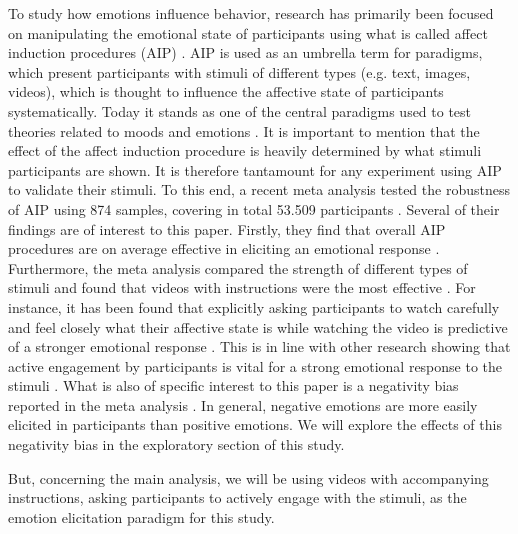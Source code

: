\documentclass{article}
\begin{document}
    To study how emotions influence behavior, research has primarily been focused on manipulating the emotional state of participants using what is called affect induction procedures (AIP) \cite{joseph2020pbb}. AIP is used as an umbrella term for paradigms, which present participants with stimuli of different types (e.g. text, images, videos), which is thought to influence the affective state of participants systematically. Today it stands as one of the central paradigms used to test theories related to moods and emotions \cite{joseph2020pbb}. It is important to mention that the effect of the affect induction procedure is heavily determined by what stimuli participants are shown. It is therefore tantamount for any experiment using AIP to validate their stimuli. To this end, a recent meta analysis tested the robustness of AIP using 874 samples, covering in total 53.509 participants \cite{joseph2020pbb}. Several of their findings are of interest to this paper. Firstly, they find that overall AIP procedures are on average effective in eliciting an emotional response \cite{joseph2020pbb}. Furthermore, the meta analysis compared the strength of different types of stimuli and found that videos with instructions were the most effective \cite{joseph2020pbb}. For instance, it has been found that explicitly asking participants to watch carefully and feel closely what their affective state is while watching the video is predictive of a stronger emotional response \cite{joseph2020pbb}. This is in line with other research showing that active engagement by participants is vital for a strong emotional response to the stimuli \cite{out2020gradual}. 
What is also of specific interest to this paper is a negativity bias reported in the meta analysis \cite{joseph2020pbb}. In general, negative emotions are more easily elicited in participants than positive emotions. We will explore the effects of this negativity bias in the exploratory section of this study. 

But, concerning the main analysis, we will be using videos with accompanying instructions, asking participants to actively engage with the stimuli, as the emotion elicitation paradigm for this study.
\end{document}
